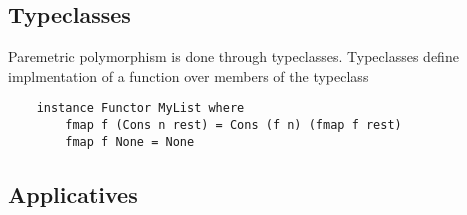\documentclass{article}
\begin{document}
\subsection{Typeclasses}
Paremetric polymorphism is done through typeclasses. Typeclasses define
implmentation of a function over members of the typeclass

\begin{verbatim}
    instance Functor MyList where
        fmap f (Cons n rest) = Cons (f n) (fmap f rest)
        fmap f None = None
    \end{verbatim}
\FloatBarrier

\subsection{Applicatives}


\appendix
\end{document}
